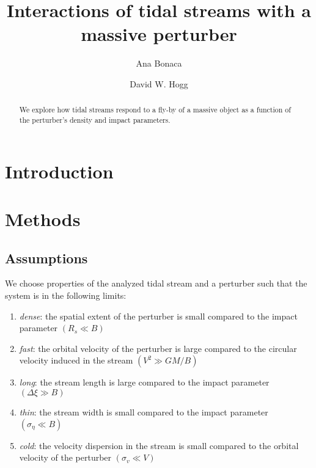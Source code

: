 \documentclass[modern]{aastex62}
\begin{document}
\sloppy\sloppypar\raggedbottom\frenchspacing %

\title{Interactions of tidal streams with a massive perturber}


\author[0000-0002-7846-9787]{Ana Bonaca}

\author[0000-0003-2866-9403]{David W. Hogg}

\begin{abstract}\noindent %
We explore how tidal streams respond to a fly-by of a massive object as a function of the perturber's density and impact parameters.
\end{abstract}


\section{Introduction}


\section{Methods}
\subsection{Assumptions}
We choose properties of the analyzed tidal stream and a perturber such that the system is in the following limits:
\begin{enumerate}
 \item{\emph{dense}: the spatial extent of the perturber is small compared to the impact parameter $(R_s\ll B)$
 }
 \item{\emph{fast}: the orbital velocity of the perturber is large compared to the circular velocity induced in the stream $(V^2\gg GM/B)$
 }
 \item{\emph{long}: the stream length is large compared to the impact parameter $(\Delta\xi\gg B)$
 }
 \item{\emph{thin}: the stream width is small compared to the impact parameter $(\sigma_\eta\ll B)$
 }
 \item{\emph{cold}: the velocity dispersion in the stream is small compared to the orbital velocity of the perturber $(\sigma_v\ll V)$
 }
\end{enumerate}
\end{document}
